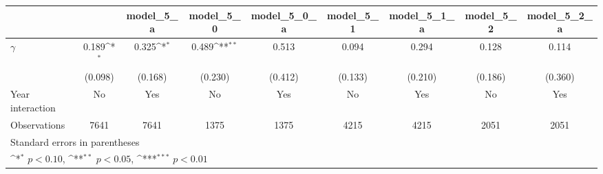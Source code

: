 {
\def\sym#1{\ifmmode^{#1}\else\(^{#1}\)\fi}
\begin{tabular}{l*{8}{c}}
\toprule
                &\multicolumn{1}{c}{}&\multicolumn{1}{c}{model\_5\_a}&\multicolumn{1}{c}{model\_5\_0}&\multicolumn{1}{c}{model\_5\_0\_a}&\multicolumn{1}{c}{model\_5\_1}&\multicolumn{1}{c}{model\_5\_1\_a}&\multicolumn{1}{c}{model\_5\_2}&\multicolumn{1}{c}{model\_5\_2\_a}\\
\midrule
$\gamma$        &    0.189\sym{*}  &    0.325\sym{*}  &    0.489\sym{**} &    0.513         &    0.094         &    0.294         &    0.128         &    0.114         \\
                &  (0.098)         &  (0.168)         &  (0.230)         &  (0.412)         &  (0.133)         &  (0.210)         &  (0.186)         &  (0.360)         \\
\addlinespace
Year interaction &       No         &      Yes         &       No         &      Yes         &       No         &      Yes         &       No         &      Yes         \\
\midrule
Observations    &     7641         &     7641         &     1375         &     1375         &     4215         &     4215         &     2051         &     2051         \\
\bottomrule
\multicolumn{9}{l}{\footnotesize Standard errors in parentheses}\\
\multicolumn{9}{l}{\footnotesize \sym{*} \(p<0.10\), \sym{**} \(p<0.05\), \sym{***} \(p<0.01\)}\\
\end{tabular}
}
